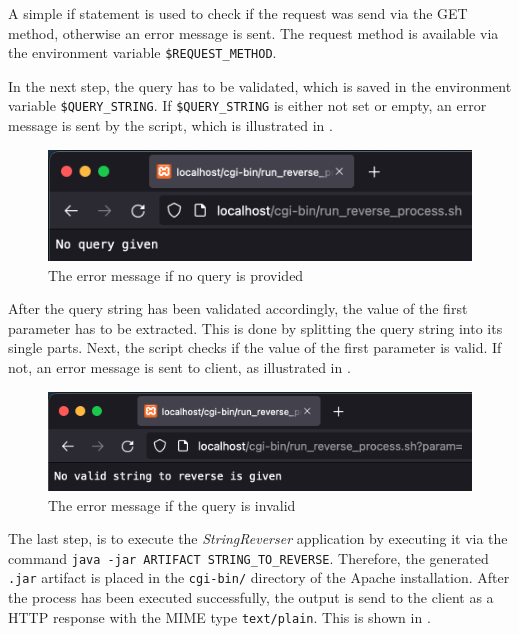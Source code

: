 A simple if statement is used to check if the request was send via the GET method, otherwise an error message is sent. The request method is available via the environment variable \texttt{\$REQUEST\_METHOD}.


In the next step, the query has to be validated, which is saved in the environment variable \texttt{\$QUERY\_STRING}. If \texttt{\$QUERY\_STRING} is either not set or empty, an error message is sent by the script, which is illustrated in .

\begin{figure}[h]
\centering
\includegraphics[scale=0.6]{images/part2Failure1}
\caption{The error message if no query is provided}
\label{fig:01_part2_impl_failure1}
\end{figure}

After the query string has been validated accordingly, the value of the first parameter has to be extracted. This is done by splitting the query string into its single parts. Next, the script checks if the value of the first parameter is valid. If not, an error message is sent to client, as illustrated in .

\begin{figure}[h]
\centering
\includegraphics[scale=0.6]{images/part2Failure2}
\caption{The error message if the query is invalid}
\label{fig:01_part2_impl_failure2}
\end{figure}

The last step, is to execute the \textit{StringReverser} application by executing it via the command \texttt{java -jar ARTIFACT STRING\_TO\_REVERSE}. Therefore, the generated \texttt{.jar} artifact is placed in the \texttt{cgi-bin/} directory of the Apache installation. After the process has been executed successfully, the output is send to the client as a HTTP response with the MIME type \texttt{text/plain}. This is shown in .

